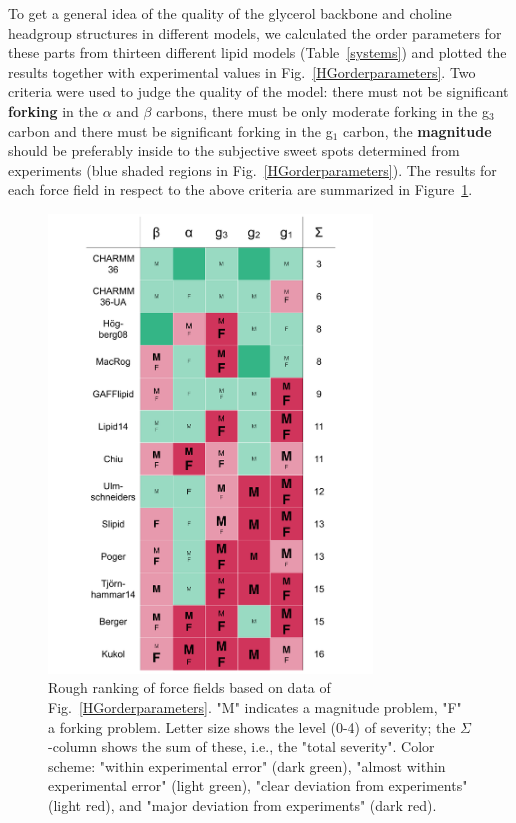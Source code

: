 \documentclass[journal=jacsat,manuscript=article]{achemso}
\begin{document}
To get a general idea of the quality of the glycerol backbone and choline headgroup structures in different models, we calculated 
the order parameters for these parts from thirteen different lipid models (Table~\ref{systems}) and 
plotted the results together with experimental values in Fig.~\ref{HGorderparameters}.
Two criteria were used to judge the quality of the model: there must not be significant  {\bf forking} in the $\alpha$ and $\beta$ carbons,
there must be only moderate forking in the g$_3$ carbon and there must be significant forking in the g$_1$ carbon, the {\bf magnitude}
should be preferably inside to the subjective sweet spots determined from experiments (blue shaded regions in Fig.~\ref{HGorderparameters}).
The results for each force field in respect to the above criteria are summarized in Figure~\ref{FullHydrationComparisonTable}.
\begin{figure}[]
  \centering
  \includegraphics[width=8.6cm]{../DATAreportediINblog/comparisonTable.pdf}
  \newline
  \caption{\label{FullHydrationComparisonTable}
Rough ranking of force fields based on data of Fig.~\ref{HGorderparameters}.
"M" indicates a magnitude problem,
"F" a forking problem.
Letter size shows the level (0-4) of severity;
the $\Sigma$-column shows the sum of these, i.e., the "total severity".
Color scheme:
"within experimental error" (dark green),
"almost within experimental error" (light green),
"clear deviation from experiments" (light red), and
"major deviation from experiments" (dark red).
  } 
\end{figure}
\end{document}
